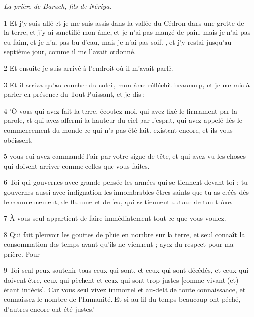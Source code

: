\par \textit{La prière de Baruch, fils de Nériya.}

\par 1 Et j'y suis allé et je me suis assis dans la vallée du Cédron dans une grotte de la terre, et j'y ai sanctifié mon âme, et je n'ai pas mangé de pain, mais je n'ai pas eu faim, et je n'ai pas bu d'eau, mais je n'ai pas soif. , et j'y restai jusqu'au septième jour, comme il me l'avait ordonné.

\par 2 Et ensuite je suis arrivé à l'endroit où il m'avait parlé.

\par 3 Et il arriva qu'au coucher du soleil, mon âme réfléchit beaucoup, et je me mis à parler en présence du Tout-Puissant, et je dis :

\par 4 'Ô vous qui avez fait la terre, écoutez-moi, qui avez fixé le firmament par la parole, et qui avez affermi la hauteur du ciel par l'esprit, qui avez appelé dès le commencement du monde ce qui n'a pas été fait. existent encore, et ils vous obéissent.

\par 5 vous qui avez commandé l'air par votre signe de tête, et qui avez vu les choses qui doivent arriver comme celles que vous faites.

\par 6 Toi qui gouvernes avec grande pensée les armées qui se tiennent devant toi ; tu gouvernes aussi avec indignation les innombrables êtres saints que tu as créés dès le commencement, de flamme et de feu, qui se tiennent autour de ton trône.

\par 7 À vous seul appartient de faire immédiatement tout ce que vous voulez.

\par 8 Qui fait pleuvoir les gouttes de pluie en nombre sur la terre, et seul connaît la consommation des temps avant qu'ils ne viennent ; ayez du respect pour ma prière. Pour

\par 9 Toi seul peux soutenir tous ceux qui sont, et ceux qui sont décédés, et ceux qui doivent être, ceux qui pèchent et ceux qui sont trop justes [comme vivant (et) étant indécis]. Car vous seul vivez immortel et au-delà de toute connaissance, et connaissez le nombre de l'humanité. Et si au fil du temps beaucoup ont péché, d'autres encore ont été justes.'

